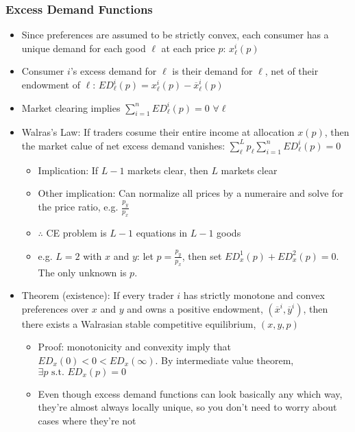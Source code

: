 \documentclass{article}
\newcommand{\olx}{\overline{x}}
\newcommand{\oly}{\overline{y}}
\newcommand{\blue}[1]{{\color{blue}#1}}
\newcommand{\sumn}{\sum_{i=1}^n}
\begin{document}
\subsubsection{Excess Demand Functions}
\begin{itemize}
	\item Since preferences are assumed to be strictly convex, each consumer has a unique demand for each good $\ell$ at each price $p$: $x_\ell^i(p)$
	\item Consumer $i$'s \blue{excess demand} for $\ell$ is their demand for $\ell$, net of their endowment of $\ell$: ${ED^i_\ell(p)=x_\ell^i(p)-\olx_\ell^i(p)}$
	\item Market clearing implies $\sumn ED_\ell^i(p)=0$ $\forall \ell$
	\item \blue{Walras's Law:} If traders cosume their entire income at allocation $x(p)$, then the market calue of net excess demand vanishes: ${\sum_\ell^Lp_\ell \sumn ED^i_\ell(p)=0}$
		\begin{itemize}
			\item Implication: If $L-1$ markets clear, then $L$ markets clear
			\item Other implication: Can normalize all prices by a numeraire and solve for the price ratio, e.g. $\frac{p_y}{p_x}$
			\item $\therefore$ CE problem is $L-1$ equations in $L-1$ goods
			\item e.g. $L=2$ with $x$ and $y$: let $p=\frac{p_y}{p_x}$, then set ${ED^1_x(p) + ED^2_x(p) = 0}$. The only unknown is $p$.
		\end{itemize}
	\item \blue{Theorem (existence):} If every trader $i$ has strictly monotone and convex preferences over $x$ and $y$ and owns a positive endowment, $(\olx^i,\oly^i)$, then there exists a Walrasian stable competitive equilibrium, $(x,y,p)$
		\begin{itemize}
			\item Proof: monotonicity and convexity imply that ${ED_x(0)<0<ED_x(\infty)}$. By intermediate value theorem, ${\exists p\text{ s.t. }ED_x(p)=0}$
			\item Even though excess demand functions can look basically any which way, they're almost always locally unique, so you don't need to worry about cases where they're not
		\end{itemize}
\end{itemize}
\end{document}
